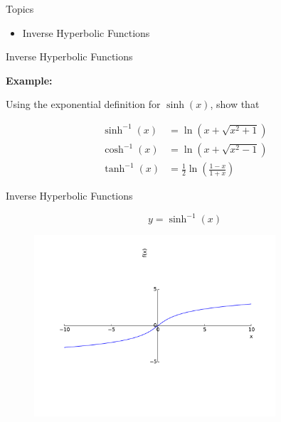 \documentclass[10pt]{beamer}
\begin{document}
\begin{frame}{Topics}
  \begin{itemize}
	  \item Inverse Hyperbolic Functions
  \end{itemize}
\end{frame}

\begin{frame}{Inverse Hyperbolic Functions}

	\textbf{Example:}
	
	Using the exponential definition for $\sinh(x)$, show that
	
	\begin{align*}
		\sinh^{-1}(x) &= \ln\left(x + \sqrt{x^2+1}\right) \\
		\cosh^{-1}(x) &= \ln\left(x + \sqrt{x^2-1}\right) \\
		\tanh^{-1}(x) &= \frac12\ln\left(\frac{1-x}{1+x}\right)
	\end{align*}

\end{frame}

\begin{frame}{Inverse Hyperbolic Functions}

	\begin{equation*}
		y = \sinh^{-1}(x)
	\end{equation*}

	\begin{figure}
		\includegraphics[width=0.8\textwidth]{beamer-pics/hyperbolics-4.pdf}
	\end{figure}

\end{frame}
\end{document}
